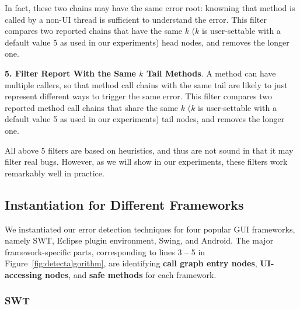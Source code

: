 In fact, these two chains may have the same error root: knowning that
method  is called by a non-UI thread is sufficient to understand
the error.
This filter compares two reported chains that have the same
$k$ ($k$ is user-settable with a default value 5 as used in our
experiments) head nodes, and removes the longer one.

\textbf{5. Filter Report With the Same $k$ Tail Methods}. A method
can have multiple callers, so that method call chains with the same tail are likely
to just represent different ways to trigger the same error. This filter compares 
two reported method call chains that share the same 
$k$ ($k$ is user-settable with a default value 5 as used in our
experiments) tail nodes, and removes the longer one.


\vspace{1mm}

All above 5 filters are based on heuristics, and thus are not sound in
that it may filter real bugs. However, as we will show in
our experiments, these filters work remarkably well in practice.


\subsection{Instantiation for Different Frameworks}
\label{sec:platforms}

We instantiated our error detection techniques for four popular GUI frameworks,
namely SWT, Eclipse plugin environment, Swing, and Android.
The major framework-specific parts, corresponding to
lines 3 -- 5 in Figure~\ref{fig:detectalgorithm}, are identifying
\textbf{call graph entry nodes}, \textbf{UI-accessing nodes},
and \textbf{safe methods} for each framework.





\subsubsection{SWT}

